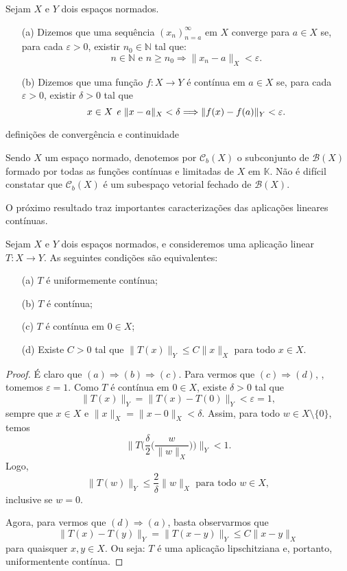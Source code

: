 \begin{definition}
Sejam $X$ e $Y$ dois espaços normados.
\begin{itemize}
\item[(a)] Dizemos que uma sequência $(x_n)_{n=a}^{\infty}$ em $X$ converge para $a\in X$ se, para cada $\varepsilon >0$, existir $n_0 \in \mathbb N$ tal que:
\[
\displaystyle n\in \mathbb N \text{ e } n\geq n_0 \Longrightarrow \|x_n - a\|_X < \varepsilon .
\]
\item[(b)] Dizemos que uma função $f:X\longrightarrow Y$ é contínua em $a\in X$ se, para cada $\varepsilon >0$, existir $\delta >0$ tal que
\[
x\in X \emph{ e } \|x-a\|_X <\delta \Longrightarrow \|f(x) - f(a)\|_Y < \varepsilon .
\]
\end{itemize}
{\color{red} definições de convergência e continuidade}
\end{definition}



\begin{example}\label{ex23}
    Sendo $X$ um espaço normado, denotemos por $\mathcal C_b (X)$ o subconjunto de $\mathcal B (X)$ formado por todas as funções contínuas e limitadas de $X$ em $\mathbb K$. Não é difícil constatar que $\mathcal C_b (X)$ é um subespaço vetorial fechado de $\mathcal B (X)$.
\end{example}

O próximo resultado traz importantes caracterizações das aplicações lineares contínuas.

\begin{proposition}\label{continuous}
Sejam $X$ e $Y$ dois espaços normados, e consideremos uma aplicação linear $T:X\longrightarrow Y$. As seguintes condições são equivalentes:

\begin{itemize}
\item[(a)] $T$ é uniformemente contínua;
\item[(b)] $T$ é contínua;
\item[(c)] $T$ é contínua em $0\in X$;
\item[(d)] Existe $C>0$ tal que $\|T(x)\|_Y \leq C \|x\|_X$ para todo $x\in X$.
\end{itemize}
\end{proposition}

\begin{proof}
É claro que $(a)\Longrightarrow (b) \Longrightarrow (c)$. Para vermos que $(c)\Longrightarrow (d)$, , tomemos $\varepsilon =1$. Como $T$ é contínua em $0\in X$, existe $\delta >0$ tal que
\[
\displaystyle \|T(x)\|_Y =\|T(x) - T(0)\|_Y <\varepsilon =1,
\]
sempre que $x\in X$ e $\|x\|_X = \|x-0\|_X <\delta$. Assim, para todo $w\in X\setminus \{0\}$, temos
\[
\displaystyle \bigg\|T\bigg( \frac{\delta}{2} \bigg( \frac{w}{\|w\|_X} \bigg)\bigg) \bigg\|_Y <1.
\]
Logo, 
\[
\|T(w)\|_Y \leq \frac{2}{\delta}  \|w\|_X \text{  para todo  } w\in X,
\]
inclusive se $w=0$.

Agora, para vermos que $(d)\Longrightarrow (a)$, basta observarmos que
\[
\|T(x) - T(y)\|_Y =\|T(x-y)\|_Y \leq C \|x-y\|_X
\]
para quaisquer $x,y\in X$. Ou seja: $T$ é uma aplicação lipschitziana e, portanto, uniformentente contínua.
\end{proof}

